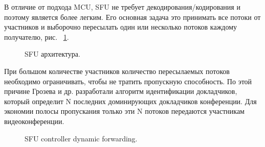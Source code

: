 В отличие от подхода MCU, SFU не требует декодирования/кодирования и поэтому является более легким. Его основная задача это принимать все потоки от участников и выборочно пересылать один или несколько потоков каждому получателю, рис. ~\ref{sfu}.

\begin{figure}[ht]
\begin{center}

\caption{
\label{sfu}
     SFU архитектура.}
\end {center}
\end {figure}

При большом количестве участников количество пересылаемых потоков необходимо ограничивать, чтобы не тратить пропускную способность. По этой причине Грозева и др. разработали алгоритм идентификации докладчиков, который определит N последних доминирующих докладчиков конференции. Для экономии полосы пропускания только эти N потоков передаются участникам видеоконференции.

\begin{figure}[ht]
\begin{center}

\caption{
\label{sfu-forwarding}
     SFU controller dynamic forwarding.}
\end {center}
\end {figure}

